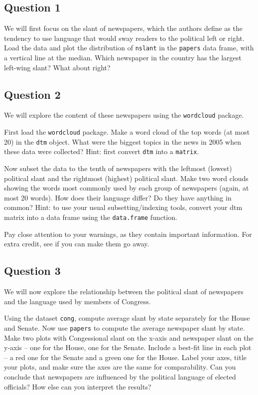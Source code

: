 \documentclass[]{article}
\begin{document}
\subsection{Question 1}\label{question-1}

We will first focus on the slant of newspapers, which the authors define
as the tendency to use language that would sway readers to the political
left or right. Load the data and plot the distribution of
\texttt{nslant} in the \texttt{papers} data frame, with a vertical line
at the median. Which newspaper in the country has the largest left-wing
slant? What about right?

\subsection{Question 2}\label{question-2}

We will explore the content of these newspapers using the
\texttt{wordcloud} package.

First load the \texttt{wordcloud} package. Make a word cloud of the top
words (at most 20) in the \texttt{dtm} object. What were the biggest
topics in the news in 2005 when these data were collected? Hint: first
convert \texttt{dtm} into a \texttt{matrix}.

Now subset the data to the tenth of newspapers with the leftmost
(lowest) political slant and the rightmost (highest) political slant.
Make two word clouds showing the words most commonly used by each group
of newspapers (again, at most 20 words). How does their language differ?
Do they have anything in common? Hint: to use your usual
subsetting/indexing tools, convert your dtm matrix into a data frame
using the \texttt{data.frame} function.

Pay close attention to your warnings, as they contain important
information. For extra credit, see if you can make them go away.

\subsection{Question 3}\label{question-3}

We will now explore the relationship between the political slant of
newspapers and the language used by members of Congress.

Using the dataset \texttt{cong}, compute average slant by state
separately for the House and Senate. Now use \texttt{papers} to compute
the average newspaper slant by state. Make two plots with Congessional
slant on the x-axis and newspaper slant on the y-axis -- one for the
House, one for the Senate. Include a best-fit line in each plot -- a red
one for the Senate and a green one for the House. Label your axes, title
your plots, and make sure the axes are the same for comparability. Can
you conclude that newspapers are influenced by the political language of
elected officials? How else can you interpret the results?
\end{document}
